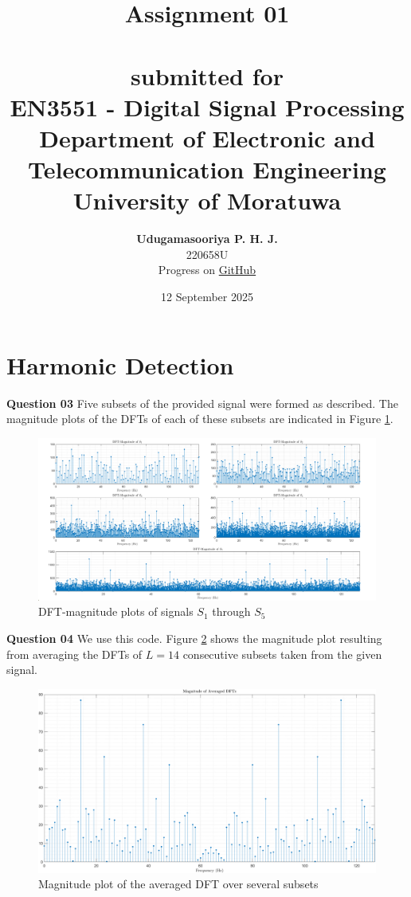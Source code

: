 \documentclass{article}[a4paper]
\title{
	\huge{\textbf{
		Assignment 01
	}}\\
	\large{\phantom{}}\\
	\large{
		submitted for
	}\\
	\Large{
		\textbf{EN3551 - Digital Signal Processing}
	}\\
	\large{
		Department of Electronic and Telecommunication Engineering
	}
	\\
	\large{University of Moratuwa}
}
\author{
	\textbf{Udugamasooriya P. H. J.}\\
	220658U\\
	\small{Progress on \href{https://github.com/pulasthi-u/en3150-assignment01}{GitHub \extlink}}
}
\date{12 September 2025}
\begin{document}
	\maketitle
	
	\section{Harmonic Detection}
	
	\textbf{Question 03} Five subsets of the provided signal were formed as described. The magnitude plots of the DFTs of each of these subsets are indicated in Figure \ref{subset_dfts}.
	
	\begin{figure}[H]
		\centering
		\includegraphics[width=\linewidth]{images/q1_3_1.png}
		\caption{DFT-magnitude plots of signals $S_1$ through $S_5$}
		\label{subset_dfts}
	\end{figure}
	
	\textbf{Question 04} We use this code. Figure \ref{avg_dft} shows the magnitude plot resulting from averaging the DFTs of $L = 14$ consecutive subsets taken from the given signal.
	
	\begin{figure}[H]
		\centering
		\includegraphics[width=\linewidth]{images/q1_3_2.png}
		\caption{Magnitude plot of the averaged DFT over several subsets}
		\label{avg_dft}
	\end{figure} 
	
\end{document}
